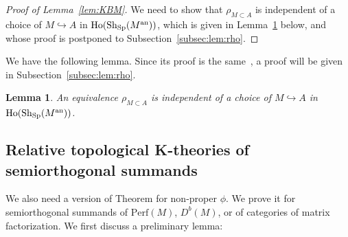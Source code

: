 \documentclass [11pt,oneside,a4paper,mathscr]{amsart}
\newtheorem{lemma}[thm]{Lemma}
\theoremstyle{definition}
\begin{document}
\begin{proof}[Proof of Lemma~\ref{lem:KBM}]
	We need to show that $\rho_{M\subset A}$ is independent of a choice of $M \hookrightarrow A$ 
in $\mathrm{Ho}(\mathrm{Sh}_{\mathrm{Sp}}(M^{\rm{an}}))$, which is given in Lemma~\ref{lem:rho} below, and whose proof is postponed to Subsection~\ref{subsec:lem:rho}. 
\end{proof}

We have the following lemma. Since its proof is 
the same~\cite[Lemma~2.9]{HLP}, a proof will be given in Subsection~\ref{subsec:lem:rho}. 
\begin{lemma}\label{lem:rho}
An equivalence $\rho_{M\subset A}$ is independent of a choice of $M \hookrightarrow A$ 
in $\mathrm{Ho}(\mathrm{Sh}_{\mathrm{Sp}}(M^{\rm{an}}))$. 
\end{lemma}
 
\subsection{Relative topological K-theories of semiorthogonal summands}
We also need a version of Theorem for non-proper $\phi$.  We prove it for semiorthogonal summands of $\mathrm{Perf}(M)$, $D^b(M)$, or 
of categories of matrix factorization. 
We first discuss a preliminary lemma: 
\end{document}
